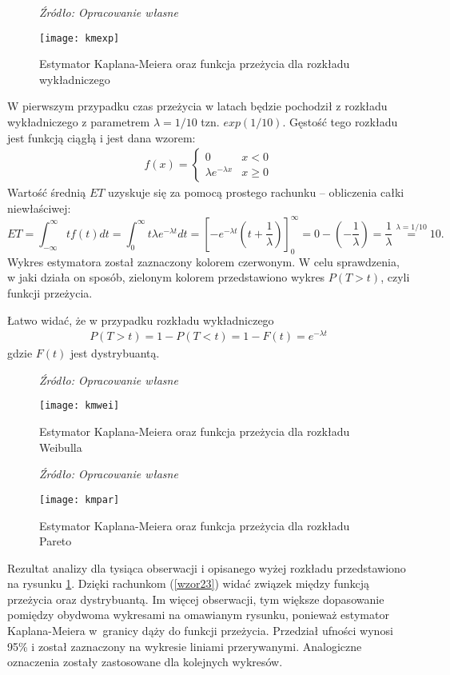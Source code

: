\documentclass[licencjacka]{pwr_wmat_praca_dyplomowa}
\theoremstyle{plain}
\numberwithin{theorem}{chapter}
\theoremstyle{definition}
\numberwithin{theorem}{chapter}
\begin{document}
 \begin{figure}[h]
 	\caption*{\textit{Źródło: Opracowanie własne}}
 	\centering
 	\texttt{[image: kmexp]}
 	\caption{Estymator Kaplana-Meiera oraz funkcja przeżycia dla rozkładu wykładniczego}\label{rys21}
 	
 \end{figure}
 W pierwszym przypadku czas przeżycia w latach będzie pochodził z rozkładu wykładniczego z parametrem $\lambda=1/10$ tzn. $exp(1/10)$. Gęstość tego rozkładu jest funkcją ciągłą i jest dana wzorem:
 \begin{align}
 f(x) = \left\{\begin{array}{ll}0 & x< 0 \\ \lambda e^{-\lambda x} & x\geqslant 0 \end{array} \right.
 \end{align}
  Wartość średnią $ET$ uzyskuje się za pomocą prostego rachunku -- obliczenia całki niewłaściwej: $$ET=\int^{\infty}_{-\infty}tf(t)dt=\int^{\infty}_0 t\lambda e^{-\lambda t}dt= \left[ -e^{-\lambda t}(t+\frac{1}{\lambda}) \right]^{\infty}_0=0-\left( -\frac{1}{\lambda}\right)=
  \dfrac{1}{\lambda}\overset{\lambda=1/10}{=}10.$$ Wykres estymatora został zaznaczony kolorem czerwonym. W celu sprawdzenia, w jaki działa on sposób, zielonym kolorem przedstawiono wykres $P(T>t)$, czyli funkcji przeżycia. 
 
 Łatwo widać, że w przypadku rozkładu wykładniczego
 \begin{align}
 P(T>t)=1-P(T<t)=1-F(t)=e^{-\lambda t}\label{wzor23}
 \end{align}
 gdzie $F(t)$ jest dystrybuantą. 


 \begin{figure}[h]
	\caption*{\textit{Źródło: Opracowanie własne}}
	\centering
	\texttt{[image: kmwei]}
	\caption{Estymator Kaplana-Meiera oraz funkcja przeżycia dla rozkładu Weibulla}\label{rys22}
	
\end{figure}

 \begin{figure}[h]
	\caption*{\textit{Źródło: Opracowanie własne}}
	\centering
	\texttt{[image: kmpar]}
	\caption{Estymator Kaplana-Meiera oraz funkcja przeżycia dla rozkładu Pareto}\label{rys23}
	
\end{figure}
Rezultat analizy dla tysiąca obserwacji i opisanego wyżej rozkładu przedstawiono na rysunku \ref{rys21}. Dzięki rachunkom (\ref{wzor23}) widać związek między funkcją przeżycia oraz dystrybuantą. Im więcej obserwacji, tym większe dopasowanie pomiędzy obydwoma wykresami na omawianym rysunku, ponieważ estymator Kaplana-Meiera w~granicy dąży do funkcji przeżycia. Przedział ufności wynosi 95\% i został zaznaczony na wykresie liniami przerywanymi. Analogiczne oznaczenia zostały zastosowane dla kolejnych wykresów.
\end{document}
